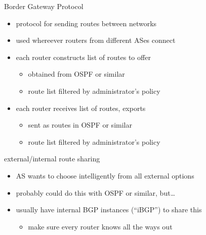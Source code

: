 \begin{frame}{Border Gateway Protocol}
    \begin{itemize}
    \item protocol for sending routes between networks
    \item used whereever routers from different ASes connect
    \vspace{.5cm}
    \item each router constructs list of routes to offer
        \begin{itemize}
        \item obtained from OSPF or similar
        \item route list filtered by administrator's policy
        \end{itemize}
    \item each router receives list of routes, exports
        \begin{itemize}
        \item sent as routes in OSPF or similar
        \item route list filtered by administrator's policy
        \end{itemize}
    \end{itemize}
\end{frame}

\begin{frame}{external/internal route sharing}
    \begin{itemize}
    \item AS wants to choose intelligently from all external options
    \item probably could do this with OSPF or similar, but\ldots
    \vspace{.5cm}
    \item usually have internal BGP instances (``iBGP'') to share this
        \begin{itemize}
        \item make sure every router knows all the ways out
        \end{itemize}
    \end{itemize}
\end{frame}
